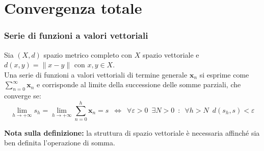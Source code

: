 \documentclass[10pt, oneside]{book}
\theoremstyle{plain}
\begin{document}
\section{Convergenza totale}

\subsubsection{Serie di funzioni a valori vettoriali}
\begin{defin}
Sia $(X,d)$ spazio metrico completo con $X$ spazio vettoriale e $d(x, y) = \|x - y\|$ con $x, y \in X$.
\\Una serie di funzioni a valori vettoriali di termine generale $\mathbf{x}_n$ si esprime come $\displaystyle \sum\limits_{n=0}^\infty \mathbf{x}_n$ e corrisponde al limite della successione delle somme parziali, che converge se:
\[\lim\limits_{h \rightarrow +\infty} s_h = \lim\limits_{h \rightarrow +\infty} \sum\limits_{n=0}^h \mathbf{x}_n = s \enspace \Leftrightarrow \enspace \forall \varepsilon > 0 \enspace \exists N > 0 \enspace : \enspace \forall h > N \enspace d(s_h,s) < \varepsilon\]
\end{defin}
\textbf{Nota sulla definizione: } la struttura di spazio vettoriale è necessaria affinché sia ben definita l'operazione di somma.
\end{document}
